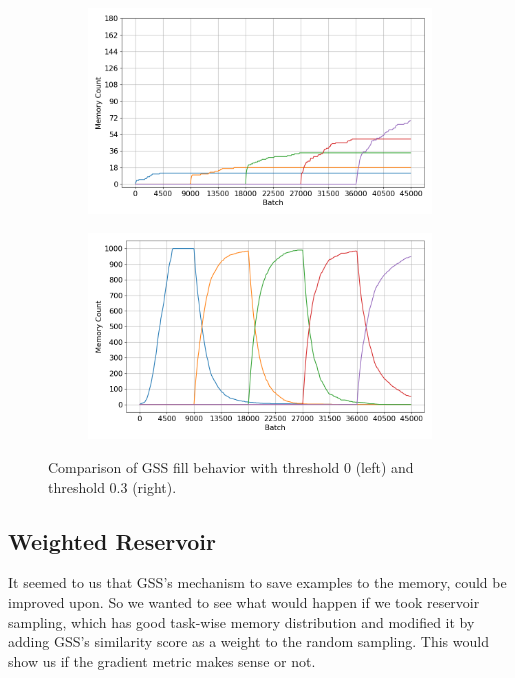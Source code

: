 \documentclass[oneside]{ctuthesis}
\begin{document}
\begin{figure}[t]
    \centering
    \begin{subfigure}[t]{0.48\linewidth}
        \centering
        \includegraphics[width=\linewidth]{figures/DISJOINT_GSS1k_B1_FILL_WITH_THRESHOLD_memory.png}
        \label{fig:gss-fill-0}
    \end{subfigure}
    \hfill
    \begin{subfigure}[t]{0.48\linewidth}
        \centering
        \includegraphics[width=\linewidth]{figures/DISJOINT_GSS1k_B1_THRESHOLD_0.3_FILL_WITH_THRESHOLD_memory.png}
        \label{fig:gss-fill-0.3}
    \end{subfigure}

    \caption{Comparison of GSS fill behavior with threshold 0 (left) and threshold 0.3 (right).}
    \label{fig:gss-fill-threshold-comparison}
\end{figure}

\subsection{Weighted Reservoir}
It seemed to us that GSS's mechanism to save examples to the memory, could be improved upon. So we wanted to see what would happen if we took reservoir sampling, which has good task-wise memory distribution and modified it by adding GSS's similarity score as a weight to the random sampling. This would show us if the gradient metric makes sense or not.
\end{document}
